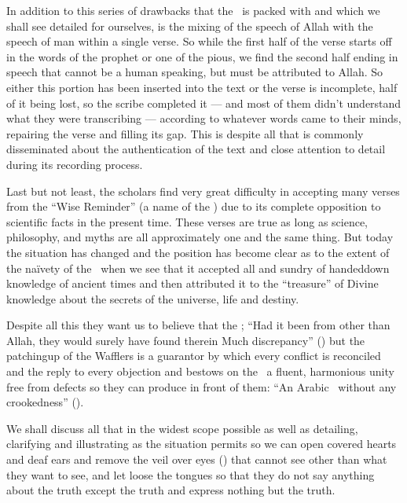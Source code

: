\documentclass[12pt]{memoir}
\begin{document}
In addition to this series of drawbacks that the \Quran\ is packed with
and which we shall see detailed for ourselves,
is the mixing of the speech of Allah with
the speech of man within a single verse.
So while the first half of the verse starts off
in the words of the prophet or one of the pious,
we find the second half ending in speech that cannot be a human speaking,
but must be attributed to Allah.
So either this portion has been inserted
into the text or the verse is incomplete,
half of it being lost, so the scribe completed it —
and most of them didn’t understand what they were transcribing —
according to whatever words came to their minds,
repairing the verse and filling its gap.
This is despite all that is commonly disseminated
about the authentication of the text and close attention
to detail during its recording process.

Last but not least, the scholars find very great difficulty in
accepting many verses from the “Wise Reminder” (a name of the \Quran)
due to its complete opposition to scientific facts in the present time.
These verses are true as long as science, philosophy,
and myths are all approximately one and the same thing.
But today the situation has changed and the position has become clear
as to the extent of the naïvety of the \Quran\ when we see
that it accepted all and sundry of handed\–down knowledge of ancient times
and then attributed it to the “treasure” of Divine knowledge
about the secrets of the universe, life and destiny.

Despite all this they want us to believe that the \Quran;
“Had it been from other than Allah, they would surely
have found therein Much discrepancy” ()
but the patching\–up of the Wafflers is a guarantor by which every conflict
is reconciled and the reply to every objection
and bestows on the \Quran\ a fluent,
harmonious unity free from defects so they can produce in front of them:
“An Arabic \Quran\ without any crookedness” ().

We shall discuss all that in the widest scope possible as well as detailing,
clarifying and illustrating as the situation permits so we can open
covered hearts and deaf ears and remove the veil over eyes
()
that cannot see other than what they want to see, and let loose the tongues
so that they do not say anything about the truth
except the truth and express nothing but the truth.
\end{document}
